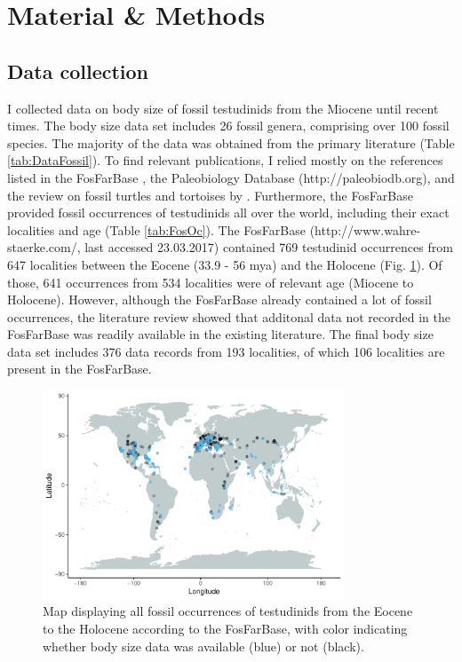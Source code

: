 \section{Material \& Methods}

\subsection{Data collection}
I collected data on body size of fossil testudinids from the Miocene until recent times. The body size data set includes 26 fossil genera, comprising over 100 fossil species. The majority of the data was obtained from the primary literature (Table \ref{tab:DataFossil}). To find relevant publications, I relied mostly on the references listed in the FosFarBase \citep{Bohme2003b}, the Paleobiology Database (http://paleobiodb.org), and the review on fossil turtles and tortoises by \cite{rhodin2015turtles}.
Furthermore, the FosFarBase provided fossil occurrences of testudinids all over the world, including their exact localities and age (Table \ref{tab:FosOc}). The FosFarBase (http://www.wahre-staerke.com/, last accessed 23.03.2017) contained 769 testudinid occurrences from 647 localities between the Eocene (33.9 - 56 mya) and the Holocene (Fig. \ref{fig:mapOc}). Of those, 641 occurrences from 534 localities were of relevant age (Miocene to Holocene). However, although the FosFarBase already contained a lot of fossil occurrences, the literature review showed that additonal data not recorded in the FosFarBase was readily available in the existing literature. 
The final body size data set includes 376 data records from 193 localities, of which 106 localities are present in the FosFarBase.


 \begin{figure}[htbp]
 	\centering
 	\includegraphics[width=0.8\textwidth]{MA_JJ_files/figure-latex/MapFossilOccurrences-1.pdf}
 	\caption[Map: fossil occurrences]{Map displaying all fossil occurrences of testudinids from the Eocene to the Holocene according to the FosFarBase, with
 		color indicating whether body size data was available (blue) or not (black).}
 	\label{fig:mapOc}
 \end{figure}

